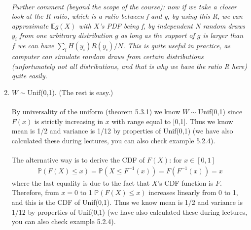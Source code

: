 \begin{exercise}[BH.5.55]
\begin{solution}
\begin{enumerate}
    	~\\
    	\textit{Further comment (beyond the scope of the course): now if we take a closer look at the R ratio, which is a ratio between f and g, by using this R, we can approximate $\mathbb{E}g(X)$ with $X$'s PDF being f, by independent N random draws $y_i$ from one arbitrary distribution $g$ as long as the support of $g$ is larger than $f$ we can have $\sum_i H(y_i)R(y_i)/N $. This is quite useful in practice, as computer can simulate random draws from certain distributions (unfortunately not all distributions, and that is why we have the ratio R here) quite easily.}
    	 
    	\item $W\sim$Unif(0,1). (The rest is easy.)\\~\\
    	By universality of the uniform (theorem 5.3.1) we know $W\sim $Unif(0,1) since $F(x)$ is strictly increasing in $x$ with range equal to [0,1]. Thus we know mean is 1/2 and variance is 1/12 by properties of Unif(0,1) (we have also calculated these during lectures, you can also check example 5.2.4).\\~\\
    	The alternative way is to derive the CDF of $F(X)$:
    	for $x\in [0,1]$
    	\begin{align*}
    		\mathbb{P}(F(X)\leq x) = \mathbb{P}(X\leq F^{-1}(x)) =F\left( F^{-1}(x)\right) = x
    	\end{align*}
    	where the last equality is due to the fact  that $X$'s CDF function is $F$. Therefore, from $x=0$ to 1 $	\mathbb{P}(F(X)\leq x)$ increases linearly from 0 to 1, and this is the CDF of Unif(0,1). Thus we know mean is 1/2 and variance is 1/12 by properties of Unif(0,1) (we have also calculated these during lectures, you can also check example 5.2.4).
	\end{enumerate}
\end{solution}
\end{exercise}


